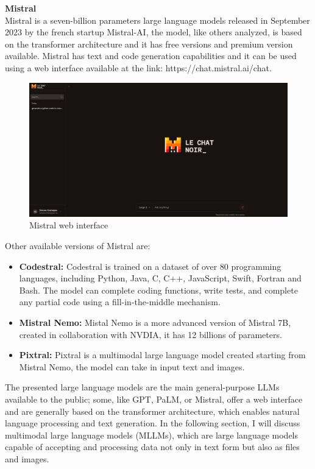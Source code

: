 \textbf{Mistral}\\
Mistral is a seven-billion parameters large language models released in September 2023 by the french startup Mistral-AI, the model, like others analyzed, is based on the transformer architecture and it has free versions and premium version available.\cite{jiang2023mistral} Mistral has text and code generation capabilities and it can be used using a web interface available at the link: https://chat.mistral.ai/chat. 
\begin{figure}[H]
    \centering
    \includegraphics[width=0.9\linewidth]{Figures/fig_20.png}
    \caption{Mistral web interface}
    \label{fig:enter-label}
\end{figure}
Other available versions of Mistral are:
\begin{itemize}
    \item \textbf{Codestral:} Codestral is trained on a dataset of over 80 programming languages, including Python, Java, C, C++, JavaScript, Swift, Fortran and Bash. The model can complete coding functions, write tests, and complete any partial code using a fill-in-the-middle mechanism. 
    \item \textbf{Mistral Nemo:} Mistal Nemo is a more advanced version of Mistral 7B, created in collaboration with NVDIA, it has 12 billions of parameters.
    \item \textbf{Pixtral:} Pixtral is a multimodal large language model created starting from Mistral Nemo, the model can take in input text and images.
\end{itemize}
The presented large language models are the main general-purpose LLMs available to the public; some, like GPT, PaLM, or Mistral, offer a web interface and are generally based on the transformer architecture, which enables natural language processing and text generation. In the following section, I will discuss multimodal large language models (MLLMs), which are large language models capable of accepting and processing data not only in text form but also as files and images.

